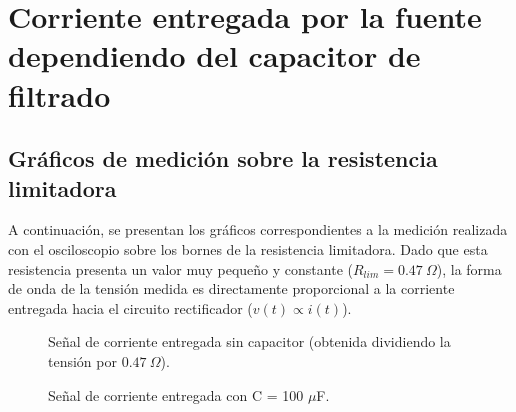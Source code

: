 \section{Corriente entregada por la fuente dependiendo del capacitor de filtrado}

\subsection{Gráficos de medición sobre la resistencia limitadora}
A continuación, se presentan los gráficos correspondientes a la medición realizada con el osciloscopio sobre los bornes de la resistencia limitadora. Dado que esta resistencia presenta un valor muy pequeño y constante ($R_{lim} = 0.47\ \Omega$), la forma de onda de la tensión medida es directamente proporcional a la corriente entregada hacia el circuito rectificador ($v(t) \propto i(t)$).

\begin{figure}[htbp]
    \centering
    \caption{Señal de corriente entregada sin capacitor (obtenida dividiendo la tensión por $0.47\ \Omega$).}
    \label{fig:corriente_sin_capacitor}
\end{figure}

\begin{figure}[htbp]
    \centering
    \caption{Señal de corriente entregada con C = 100 $\mu$F.}
    \label{fig:corriente_capacitor_100u}
\end{figure}

